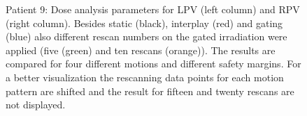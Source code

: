 \documentclass[type=dr, dr=rernat, accentcolor=tud7b,colorbacktitle, bigchapter, openright, twoside, 12pt ]{tudthesis}
\begin{document}
\begin{figure}[H]
{ }
\caption{Patient 9: Dose analysis parameters for LPV (left column) and RPV (right column). Besides static (black), interplay (red) and gating 
(blue) also different rescan numbers on the gated irradiation were applied (five (green) and ten rescans (orange)). The results are compared for four different 
motions and different safety margins. For a better visualization the rescanning data points for each motion pattern are shifted and the result 
for fifteen and twenty rescans are not displayed.}
\label{static_interplay_gating_rescan_Pat09}
\end{figure}

\newpage

 \begin{figure}[H]
 \begin{center}
\end{center}
\end{figure}
\end{document}
